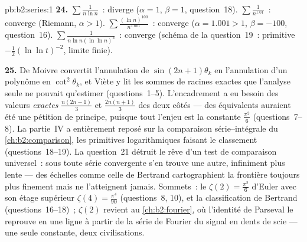 \begin{solution}{pb:b2:series:1}
\textbf{24.} $\sum\frac1{n\ln n}$~: diverge ($\alpha = 1$,
$\beta = 1$, question~18). $\sum\frac1{n^{1.01}}$~: converge
(Riemann, $\alpha > 1$). $\sum\frac{(\ln n)^{100}}{n^{1.001}}$~:
converge ($\alpha = 1.001 > 1$, $\beta = -100$, question~16).
$\sum\frac1{n\ln n(\ln\ln n)^3}$~: converge (schéma de la
question~19~: primitive $-\frac12(\ln\ln t)^{-2}$, limite finie).

\textbf{25.} De Moivre convertit l'annulation de $\sin(2n{+}1)
\theta_k$ en l'annulation d'un polynôme en $\cot^2\theta_k$, et Viète
y lit les sommes de racines exactes que l'analyse seule ne pouvait
qu'estimer (questions~1--5). L'encadrement a eu besoin des valeurs
\emph{exactes} $\frac{n(2n-1)}3$ et $\frac{2n(n+1)}3$ des deux côtés
--- des équivalents auraient été une pétition de principe, puisque
tout l'enjeu est la constante $\frac{\pi^2}6$ (questions~7--8). La
partie~IV a entièrement reposé sur la comparaison série--intégrale du
\cref{ch:b2:comparison}, les primitives logarithmiques faisant le
classement (questions~18--19). La question~21 détruit le rêve d'un
test de comparaison universel~: sous toute série convergente s'en
trouve une autre, infiniment plus lente --- des échelles comme celle
de Bertrand cartographient la frontière toujours plus finement mais
ne l'atteignent jamais. Sommets~: le $\zeta(2)
= \frac{\pi^2}6$ d'Euler avec son étage supérieur $\zeta(4) =
\frac{\pi^4}{90}$ (questions~8, 10), et la classification de Bertrand
(questions~16--18)~; $\zeta(2)$ revient au \cref{ch:b2:fourier}, où
l'identité de Parseval le reprouve en une ligne à partir de la série
de Fourier du signal en dents de scie --- une seule constante, deux
civilisations.
\end{solution}
